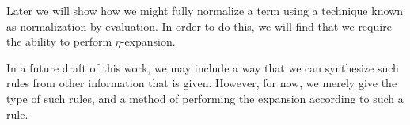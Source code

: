 {\begin{code}
\\
\>[0]\AgdaSpace{}%
\AgdaSpace{}%
\AgdaSpace{}%
\AgdaSpace{}%
\AgdaSymbol{(}\AgdaSymbol{)}\<%
\\
\>[0]\AgdaSpace{}%
\AgdaSpace{}%
\AgdaSpace{}%
\AgdaSpace{}%
\AgdaSymbol{(}\AgdaSymbol{;}\AgdaSpace{}%
\AgdaSymbol{)}\<%
\\
\>[0]\AgdaSpace{}%
\AgdaSpace{}%
\<%
\\
\>[0]\AgdaSpace{}%
\AgdaSpace{}%
\AgdaSpace{}%
\AgdaSpace{}%
\AgdaSymbol{(}\AgdaInductiveConstructor{[]}\AgdaSymbol{;}\AgdaSpace{}%
\AgdaSymbol{)}\<%
\\
\>[0]\AgdaSpace{}%
\AgdaSpace{}%
\AgdaSpace{}%
\AgdaSpace{}%
\AgdaSymbol{(}\AgdaOperator{\AgdaFunction{\AgdaUnderscore{}++\AgdaUnderscore{}}}\AgdaSymbol{)}\<%
\end{code}
}

Later we will show how we might fully normalize a term using a technique
known as normalization by evaluation. In order to do this, we will find
that we require the ability to perform $η$-expansion.

In a future draft of this work, we may include a way that we can
synthesize such rules from other information that is given. However,
for now, we merely give the type of such rules, and a method of performing
the expansion according to such a rule.

